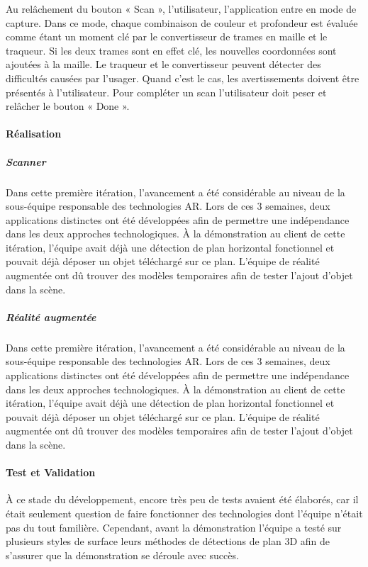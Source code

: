 \documentclass[rapport.tex]{subfiles}
\begin{document}
\par
Au relâchement du bouton « Scan », l’utilisateur, l’application entre en mode de capture. Dans ce mode, chaque combinaison de couleur et profondeur est évaluée comme étant un moment clé par le convertisseur de trames en maille et le traqueur. Si les deux trames sont en effet clé, les nouvelles coordonnées sont ajoutées à la maille. Le traqueur et le convertisseur peuvent détecter des difficultés causées par l’usager. Quand c’est le cas, les avertissements doivent être présentés à l’utilisateur. Pour compléter un scan l’utilisateur doit peser et relâcher le bouton « Done ».
\paragraph*{Réalisation}
\subparagraph*{Scanner}
Dans cette première itération, l’avancement a été considérable au niveau de la sous-équipe responsable des technologies AR. Lors de ces 3 semaines, deux applications distinctes ont été développées afin de permettre une indépendance dans les deux approches technologiques. À la démonstration au client de cette itération, l’équipe avait déjà une détection de plan horizontal fonctionnel et pouvait déjà déposer un objet téléchargé sur ce plan. L’équipe de réalité augmentée ont dû trouver des modèles temporaires afin de tester l’ajout d’objet dans la scène.
\subparagraph*{Réalité augmentée}
Dans cette première itération, l’avancement a été considérable au niveau de la sous-équipe responsable des technologies AR. Lors de ces 3 semaines, deux applications distinctes ont été développées afin de permettre une indépendance dans les deux approches technologiques. À la démonstration au client de cette itération, l’équipe avait déjà une détection de plan horizontal fonctionnel et pouvait déjà déposer un objet téléchargé sur ce plan. L’équipe de réalité augmentée ont dû trouver des modèles temporaires afin de tester l’ajout d’objet dans la scène.
\paragraph*{Test et Validation}
À ce stade du développement, encore très peu de tests avaient été élaborés, car il était seulement question de faire fonctionner des technologies dont l’équipe n’était pas du tout familière. Cependant, avant la démonstration l’équipe a testé sur plusieurs styles de surface leurs méthodes de détections de plan 3D afin de s’assurer que la démonstration se déroule avec succès.
\newpage
\end{document}
